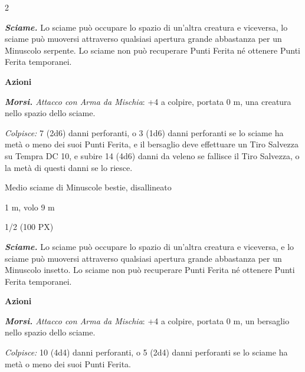 \begin{multicols}{2}
{\emph{\textbf{Sciame.}} Lo sciame può occupare lo spazio di un'altra creatura e viceversa, lo sciame può muoversi attraverso qualsiasi apertura grande abbastanza per un Minuscolo serpente. Lo sciame non può recuperare Punti Ferita né ottenere Punti Ferita temporanei.

\textbf{Azioni}

\emph{\textbf{Morsi.} Attacco con Arma da Mischia}: +4 a colpire, portata 0 m, una creatura nello spazio dello sciame.

\emph{Colpisce:} 7 (2d6) danni perforanti, o 3 (1d6) danni perforanti se lo sciame ha metà o meno dei suoi Punti Ferita, e il bersaglio deve effettuare un Tiro Salvezza su Tempra DC 10, e subire 14 (4d6) danni da veleno se fallisce il Tiro Salvezza, o la metà di questi danni se lo riesce.

\begin{description}[noitemsep, topsep=0pt, parsep=0pt, partopsep=0pt, itemsep=1pt, leftmargin=2.35cm,  labelwidth=2.2cm, itemindent=0cm, listparindent=0pt] %
\setlength{\baselineskip}{10pt}
\item[\textbf{Taglia/Tipo}] Medio sciame di Minuscole bestie, disallineato
\item[\textbf{Caratt.}] 
\item[\textbf{Punti Ferita}] 
\item[\textbf{Tiri Salvez.}] 
\item[\textbf{Movimento}] 1 m, volo 9 m
\item[\textbf{Sfida}] 1/2 (100 PX)
\end{description}
\smallskip

\emph{\textbf{Sciame.}} Lo sciame può occupare lo spazio di un'altra creatura e viceversa, e lo sciame può muoversi attraverso qualsiasi apertura grande abbastanza per un Minuscolo insetto. Lo sciame non può recuperare Punti Ferita né ottenere Punti Ferita temporanei.

\textbf{Azioni}

\emph{\textbf{Morsi.} Attacco con Arma da Mischia}: +4 a colpire, portata 0 m, un bersaglio nello spazio dello sciame.

\emph{Colpisce:} 10 (4d4) danni perforanti, o 5 (2d4) danni perforanti se lo sciame ha metà o meno dei suoi Punti Ferita.

}
\end{multicols}
